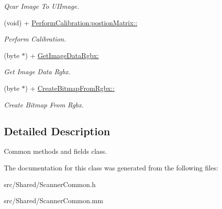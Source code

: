 \begin{DoxyCompactItemize}
\begin{DoxyCompactList}\small\item\em \-Qcar \-Image \-To \-U\-I\-Image. \end{DoxyCompactList}\item 
\hypertarget{interface_scanner_common_a3d064f12462b6c61f6589a5e4f029123}{
(void) + \hyperlink{interface_scanner_common_a3d064f12462b6c61f6589a5e4f029123}{\-Perform\-Calibration\-:postion\-Matrix\-::}}
\label{interface_scanner_common_a3d064f12462b6c61f6589a5e4f029123}

\begin{DoxyCompactList}\small\item\em \-Perform \-Calibration. \end{DoxyCompactList}\item 
\hypertarget{interface_scanner_common_a9c2a6442ce237cac94efbe9b9ca2a28f}{
(byte $\ast$) + \hyperlink{interface_scanner_common_a9c2a6442ce237cac94efbe9b9ca2a28f}{\-Get\-Image\-Data\-Rgbx\-:}}
\label{interface_scanner_common_a9c2a6442ce237cac94efbe9b9ca2a28f}

\begin{DoxyCompactList}\small\item\em \-Get \-Image \-Data \-Rgbx. \end{DoxyCompactList}\item 
\hypertarget{interface_scanner_common_ac91f280a0c73763bfde062c9217da418}{
(byte $\ast$) + \hyperlink{interface_scanner_common_ac91f280a0c73763bfde062c9217da418}{\-Create\-Bitmap\-From\-Rgbx\-::}}
\label{interface_scanner_common_ac91f280a0c73763bfde062c9217da418}

\begin{DoxyCompactList}\small\item\em \-Create \-Bitmap \-From \-Rgbx. \end{DoxyCompactList}\end{DoxyCompactItemize}


\subsection{\-Detailed \-Description}
\-Common methods and fields class. 

\-The documentation for this class was generated from the following files\-:\begin{DoxyCompactItemize}
\item 
src/\-Shared/\-Scanner\-Common.\-h\item 
src/\-Shared/\-Scanner\-Common.\-mm\end{DoxyCompactItemize}
